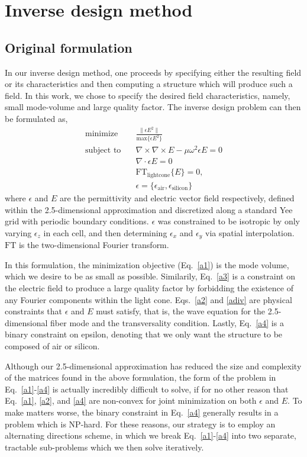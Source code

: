 \documentclass[10pt,letterpaper]{article}
\begin{document}
\section{Inverse design method}
\subsection{Original formulation}
In our inverse design method, one proceeds by specifying either the resulting field or its characteristics and then computing a structure which will produce such a field. In this work, we chose to specify the desired field characteristics, namely, small mode-volume and large quality factor. The inverse design problem can then be formulated as,
\begin{align}
\text{minimize} \quad& \frac{\|\epsilon E^2\|}{\text{max}\{\epsilon E^2\}} \label{a1}\\ 
\text{subject to} \quad 
    & \nabla\times\nabla\times E - \mu\omega^2\epsilon E = 0 \label{a2}\\
    & \nabla\cdot\epsilon E = 0 \label{adiv}\\
    & \text{FT}_\text{lightcone}\{E\} = 0, \label{a3} \\
    & \epsilon = \{\epsilon_\text{air}, \epsilon_\text{silicon}\} \label{a4}
\end{align}
where $\epsilon$ and $E$ are the permittivity and electric vector field respectively, defined within the 2.5-dimensional approximation and discretized along a standard Yee grid\cite{yee} with periodic boundary conditions. $\epsilon$ was constrained to be isotropic by only varying $\epsilon_z$ in each cell, and then determining $\epsilon_x$ and $\epsilon_y$ via spatial interpolation. $\text{FT}$ is the two-dimensional Fourier transform.

In this formulation, the minimization objective (Eq.~\ref{a1}) is the mode volume, which we desire to be as small as possible. Similarily, Eq.~\ref{a3} is a constraint on the electric field to produce a large quality factor by forbidding the existence of any Fourier components within the light cone. Eqs.~\ref{a2} and \ref{adiv} are physical constraints that $\epsilon$ and $E$ must satisfy, that is, the wave equation for the 2.5-dimensional fiber mode and the transversality condition. Lastly, Eq.~\ref{a4} is a binary constraint on epsilon, denoting that we only want the structure to be composed of air or silicon.

Although our 2.5-dimensional approximation has reduced the size and complexity of the matrices found in the above formulation, the form of the problem in Eq.~\ref{a1}-\ref{a4} is actually incredibly difficult to solve, if for no other reason that Eq.~\ref{a1}, \ref{a2}, and \ref{a4} are non-convex\cite{boydbook} for joint minimization on both $\epsilon$ and $E$. To make matters worse, the binary constraint in Eq.~\ref{a4} generally results in a problem which is NP-hard\cite{boydbook}. For these reasons, our strategy is to employ an alternating directions scheme\cite{altdir}, in which we break Eq.~\ref{a1}-\ref{a4} into two separate, tractable sub-problems which we then solve iteratively.
\end{document}
